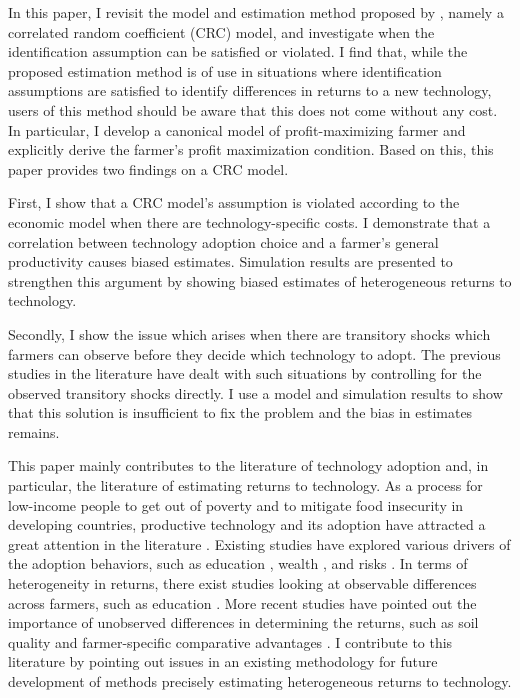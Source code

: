 \documentclass[11pt,letterpaper]{article}
\begin{document}
In this paper, I revisit the model and estimation method proposed by \citet{Suri11}, namely a correlated random coefficient (CRC) model, and investigate when the identification assumption can be satisfied or violated.
I find that, while the proposed estimation method is of use in situations where identification assumptions are satisfied to identify differences in returns to a new technology, users of this method should be aware that this does not come without any cost.
In particular, I develop a canonical model of profit-maximizing farmer and explicitly derive the farmer's profit maximization condition.
Based on this, this paper provides two findings on a CRC model.

First, I show that a CRC model's assumption is violated according to the economic model when there are technology-specific costs.
I demonstrate that a correlation between technology adoption choice and a farmer's general productivity causes biased estimates.
Simulation results are presented to strengthen this argument by showing biased estimates of heterogeneous returns to technology.

Secondly, I show the issue which arises when there are transitory shocks which farmers can observe before they decide which technology to adopt.
The previous studies in the literature have dealt with such situations by controlling for the observed transitory shocks directly.
I use a model and simulation results to show that this solution is insufficient to fix the problem and the bias in estimates remains.

This paper mainly contributes to the literature of technology adoption and, in particular, the literature of estimating returns to technology.
As a process for low-income people to get out of poverty and to mitigate food insecurity in developing countries, productive technology and its adoption have attracted a great attention in the literature \citep{feder1985adoption, foster2010microeconomics}.
Existing studies have explored various drivers of the adoption behaviors, such as education \citep{weir2000adoption}, wealth \citep{moser2006complex}, and risks \citep{dercon2011consumption}.
In terms of heterogeneity in returns, there exist studies looking at observable differences across farmers, such as education \citep{foster1996technical}.
More recent studies have pointed out the importance of unobserved differences in determining the returns, such as soil quality \citep{munshi2004social, foster2010microeconomics} and farmer-specific comparative advantages \citep{Suri11, Michler2019}.
I contribute to this literature by pointing out issues in an existing methodology for future development of methods precisely estimating heterogeneous returns to technology.
\end{document}
